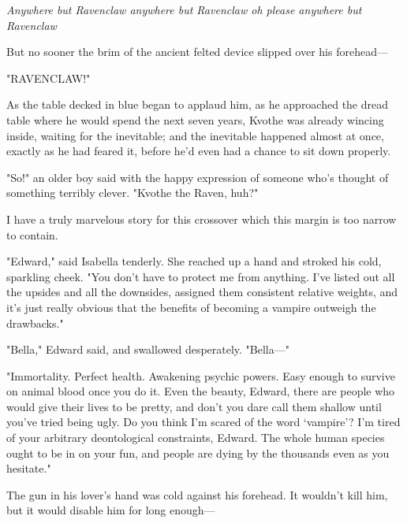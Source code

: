 \emph{Anywhere but Ravenclaw anywhere but Ravenclaw oh please anywhere but
Ravenclaw{\el}}

But no sooner the brim of the ancient felted device slipped over his forehead---

"RAVENCLAW!"

As the table decked in blue began to applaud him, as he approached the dread
table where he would spend the next seven years, Kvothe was already wincing
inside, waiting for the inevitable; and the inevitable happened almost at once,
exactly as he had feared it, before he'd even had a chance to sit down properly.

"So!" an older boy said with the happy expression of someone who's thought of
something terribly clever. "Kvothe the Raven, huh?"
\sbreak
{}

\noindent{}I have a truly marvelous story for this crossover which this margin is too
narrow to contain.
\sbreak
%

\noindent{}"Edward," said Isabella tenderly. She reached up a hand and stroked his cold,
sparkling cheek. "You don't have to protect me from anything. I've listed out
all the upsides and all the downsides, assigned them consistent relative
weights, and it's just really obvious that the benefits of becoming a vampire
outweigh the drawbacks."

"Bella," Edward said, and swallowed desperately. "Bella\mbox{---}"

"Immortality. Perfect health. Awakening psychic powers. Easy enough to survive
on animal blood once you do it. Even the beauty, Edward, there are people who
would give their lives to be pretty, and don't you dare call them shallow until
you've tried being ugly. Do you think I'm scared of the word `vampire'? I'm
tired of your arbitrary deontological constraints, Edward. The whole human
species ought to be in on your fun, and people are dying by the thousands even
as you hesitate."

The gun in his lover's hand was cold against his forehead. It wouldn't kill
him, but it would disable him for long enough---
\sbreak

